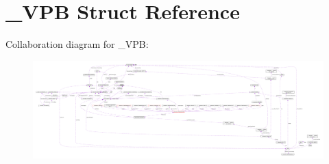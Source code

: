 \hypertarget{struct__VPB}{}\section{\+\_\+\+V\+P\+B Struct Reference}
\label{struct__VPB}


Collaboration diagram for \+\_\+\+V\+P\+B\+:
\nopagebreak
\begin{figure}[H]
\begin{center}
\leavevmode
\includegraphics[width=350pt]{struct__VPB__coll__graph}
\end{center}
\end{figure}
